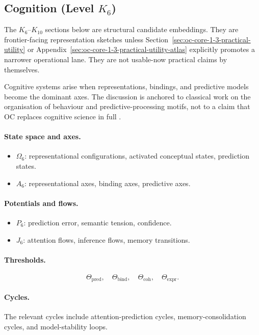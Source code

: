 \subsection{Cognition (Level \texorpdfstring{$K_6$}{K6})}

The \(K_6\)--\(K_{10}\) sections below are structural candidate embeddings.
They are frontier-facing representation sketches unless
Section~\ref{sec:oc-core-1-3-practical-utility} or
Appendix~\ref{sec:oc-core-1-3-practical-utility-atlas} explicitly promotes a
narrower operational lane. They are not usable-now practical claims by
themselves.

Cognitive systems arise when representations, bindings, and predictive models
become the dominant axes.
The discussion is anchored to classical work on the organisation of behaviour and
predictive-processing motifs, not to a claim that OC replaces cognitive
science in full \parencite{hebb_organization,friston_free_energy}.

\paragraph{State space and axes.}
\begin{itemize}
  \item \(\Omega_6\): representational configurations, activated conceptual
        states, prediction states.
  \item \(A_6\): representational axes, binding axes, predictive axes.
\end{itemize}

\paragraph{Potentials and flows.}
\begin{itemize}
  \item \(P_6\): prediction error, semantic tension, confidence.
  \item \(J_6\): attention flows, inference flows, memory transitions.
\end{itemize}

\paragraph{Thresholds.}
\[
  \Theta_{\mathrm{pred}},\quad
  \Theta_{\mathrm{bind}},\quad
  \Theta_{\mathrm{coh}},\quad
  \Theta_{\mathrm{expr}}.
\]

\paragraph{Cycles.}
The relevant cycles include attention-prediction cycles, memory-consolidation
cycles, and model-stability loops.

